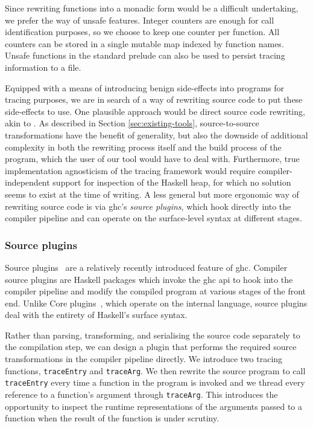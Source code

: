 \documentclass[thesis=B,english]{FITthesis}[2019/12/23]
\newcommand{\hsIdent}[1]{\texttt{#1}}
\begin{document}
Since rewriting functions into a monadic form would be a difficult undertaking,
we prefer the way of unsafe features. Integer counters are enough for call
identification purposes, so we choose to keep one counter per function. All
counters can be stored in a single mutable map indexed by function names.
Unsafe functions in the standard prelude can also be used to persist tracing
information to a file.

Equipped with a means of introducing benign side-effects into programs for
tracing purposes, we are in search of a way of rewriting source code to put
these side-effects to use. One plausible approach would be direct source code
rewriting, akin to . As described in Section
\ref{sec:existing-tools}, source-to-source transformations have the benefit of
generality, but also the downside of additional complexity in both the
rewriting process itself and the build process of the program, which the user
of our tool would have to deal with. Furthermore, true implementation
agnosticism of the tracing framework would require compiler-independent support
for inspection of the Haskell heap, for which no solution seems to exist at the
time of writing. A less general but more ergonomic way of rewriting source code
is via \acrshort{ghc}'s \textit{source plugins}, which hook directly into the
compiler pipeline and can operate on the surface-level syntax at different
stages.

\subsubsection*{Source plugins}
Source plugins~\cite{ghc-source-plugins} are a relatively recently introduced
feature of \acrshort{ghc}. Compiler source plugins are Haskell packages which
invoke the \acrshort{ghc} \acrshort{api} to hook into the compiler pipeline and
modify the compiled program at various stages of the front end. Unlike Core
plugins~\cite{ghc-compiler-plugins}, which operate on the internal language,
source plugins deal with the entirety of Haskell's surface syntax.

Rather than parsing, transforming, and serialising the source code separately
to the compilation step, we can design a plugin that performs the required
source transformations in the compiler pipeline directly. We introduce two
tracing functions, \hsIdent{traceEntry} and \hsIdent{traceArg}. We then rewrite
the source program to call \hsIdent{traceEntry} every time a function in the
program is invoked and we thread every reference to a function's argument
through \hsIdent{traceArg}. This introduces the opportunity to inspect the
runtime representations of the arguments passed to a function when the result
of the function is under scrutiny.
\end{document}
